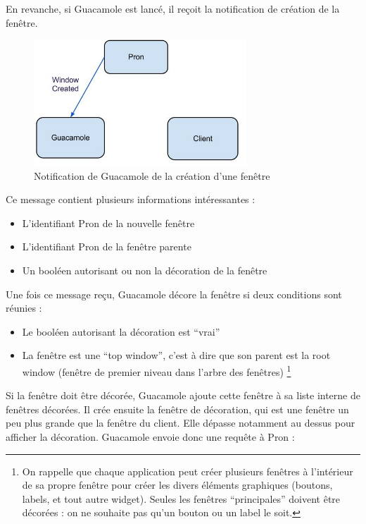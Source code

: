 En revanche, si Guacamole est lancé, il reçoit la notification de création de la fenêtre.

\begin{figure}[H]
  \centering
  \includegraphics[width=8cm]{images/Guacamole_anim_3.jpg}
  \caption{Notification de Guacamole de la création d'une fenêtre}
  \label{fig:guacamole_anim_3}
\end{figure}

Ce message contient plusieurs informations intéressantes :

\begin{itemize}
  \item L'identifiant Pron de la nouvelle fenêtre
  \item L'identifiant Pron de la fenêtre parente
  \item Un booléen autorisant ou non la décoration de la fenêtre
\end{itemize}

Une fois ce message reçu, Guacamole décore la fenêtre si deux conditions sont réunies :

\begin{itemize}
  \item Le booléen autorisant la décoration est ``vrai''
  \item La fenêtre est une ``top window'', c'est à dire que son parent est la root window (fenêtre de premier niveau dans l'arbre des fenêtres)
    \footnote{On rappelle que chaque application peut créer plusieurs fenêtres à l'intérieur de sa propre fenêtre pour créer les divers éléments graphiques (boutons, labels, et tout autre widget). Seules les fenêtres ``principales'' doivent être décorées : on ne souhaite pas qu'un bouton ou un label le soit.} 
\end{itemize}

Si la fenêtre doit être décorée, Guacamole ajoute cette fenêtre à sa liste interne de fenêtres décorées.
Il crée ensuite la fenêtre de décoration, qui est une fenêtre un peu plus grande que la fenêtre du client.
Elle dépasse notamment au dessus pour afficher la décoration.
Guacamole envoie donc une requête à Pron :

